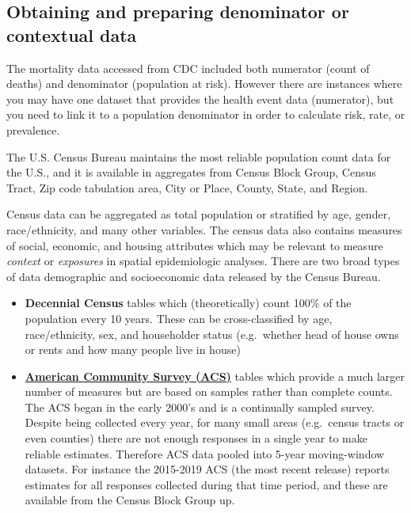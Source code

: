 \documentclass[
]{book}
\providecommand{\tightlist}{%
  \setlength{\itemsep}{0pt}\setlength{\parskip}{0pt}}
\begin{document}
\hypertarget{obtaining-and-preparing-denominator-or-contextual-data}{%
\subsection{Obtaining and preparing denominator or contextual data}\label{obtaining-and-preparing-denominator-or-contextual-data}}

The mortality data accessed from CDC included both numerator (count of deaths) and denominator (population at risk). However there are instances where you may have one dataset that provides the health event data (numerator), but you need to link it to a population denominator in order to calculate risk, rate, or prevalence.

The U.S. Census Bureau maintains the most reliable population count data for the U.S., and it is available in aggregates from Census Block Group, Census Tract, Zip code tabulation area, City or Place, County, State, and Region.

Census data can be aggregated as total population or stratified by age, gender, race/ethnicity, and many other variables. The census data also contains measures of social, economic, and housing attributes which may be relevant to measure \emph{context} or \emph{exposures} in spatial epidemiologic analyses. There are two broad types of data demographic and socioeconomic data released by the Census Bureau.

\begin{itemize}
\tightlist
\item
  \textbf{Decennial Census} tables which (theoretically) count 100\% of the population every 10 years. These can be cross-classified by age, race/ethnicity, sex, and householder status (e.g.~whether head of house owns or rents and how many people live in house)
\item
  \textbf{\href{https://www.census.gov/programs-surveys/acs}{American Community Survey (ACS)}} tables which provide a much larger number of measures but are based on samples rather than complete counts. The ACS began in the early 2000's and is a continually sampled survey. Despite being collected every year, for many small areas (e.g.~census tracts or even counties) there are not enough responses in a single year to make reliable estimates. Therefore ACS data pooled into 5-year moving-window datasets. For instance the 2015-2019 ACS (the most recent release) reports estimates for all responses collected during that time period, and these are available from the Census Block Group up.
\end{itemize}
\end{document}
